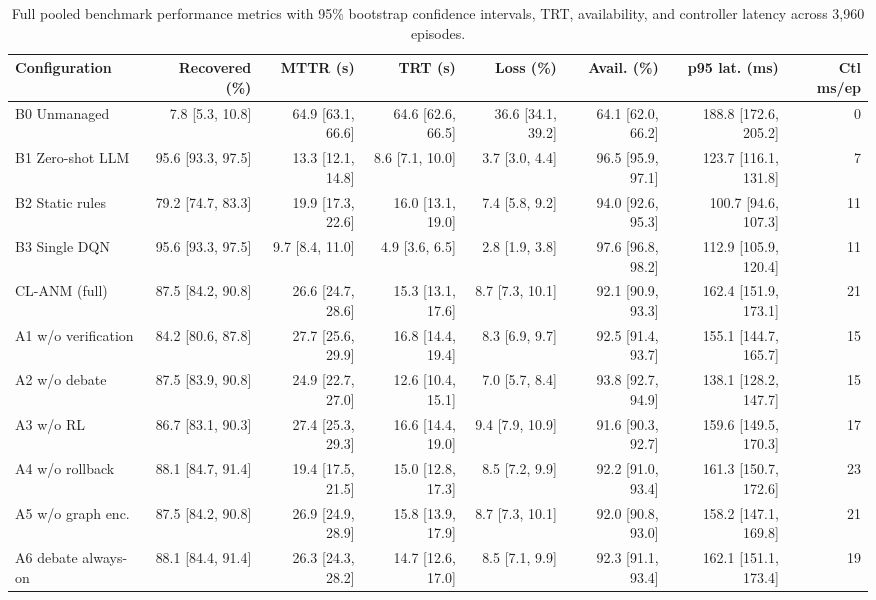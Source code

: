 \documentclass[sn-mathphys,Numbered]{sn-jnl}
\begin{document}
\begin{appendices}
\begin{table}[h]\centering\scriptsize\setlength{\tabcolsep}{3pt}
\caption{Full pooled benchmark performance metrics with 95\% bootstrap confidence intervals, TRT, availability, and controller latency across 3,960 episodes.}\label{tab:main_ci}%
\begin{adjustbox}{max width=\textwidth,center}
\begin{tabular}{lrrrrrrr}
\toprule
Configuration & Recovered (\%) & MTTR (s) & TRT (s) & Loss (\%) & Avail. (\%) & p95 lat. (ms) & Ctl ms/ep \\
\midrule
B0 Unmanaged & 7.8 [5.3, 10.8] & 64.9 [63.1, 66.6] & 64.6 [62.6, 66.5] & 36.6 [34.1, 39.2] & 64.1 [62.0, 66.2] & 188.8 [172.6, 205.2] & 0 \\
B1 Zero-shot LLM & 95.6 [93.3, 97.5] & 13.3 [12.1, 14.8] & 8.6 [7.1, 10.0] & 3.7 [3.0, 4.4] & 96.5 [95.9, 97.1] & 123.7 [116.1, 131.8] & 7 \\
B2 Static rules & 79.2 [74.7, 83.3] & 19.9 [17.3, 22.6] & 16.0 [13.1, 19.0] & 7.4 [5.8, 9.2] & 94.0 [92.6, 95.3] & 100.7 [94.6, 107.3] & 11 \\
B3 Single DQN & 95.6 [93.3, 97.5] & 9.7 [8.4, 11.0] & 4.9 [3.6, 6.5] & 2.8 [1.9, 3.8] & 97.6 [96.8, 98.2] & 112.9 [105.9, 120.4] & 11 \\
CL-ANM (full) & 87.5 [84.2, 90.8] & 26.6 [24.7, 28.6] & 15.3 [13.1, 17.6] & 8.7 [7.3, 10.1] & 92.1 [90.9, 93.3] & 162.4 [151.9, 173.1] & 21 \\
A1 w/o verification & 84.2 [80.6, 87.8] & 27.7 [25.6, 29.9] & 16.8 [14.4, 19.4] & 8.3 [6.9, 9.7] & 92.5 [91.4, 93.7] & 155.1 [144.7, 165.7] & 15 \\
A2 w/o debate & 87.5 [83.9, 90.8] & 24.9 [22.7, 27.0] & 12.6 [10.4, 15.1] & 7.0 [5.7, 8.4] & 93.8 [92.7, 94.9] & 138.1 [128.2, 147.7] & 15 \\
A3 w/o RL & 86.7 [83.1, 90.3] & 27.4 [25.3, 29.3] & 16.6 [14.4, 19.0] & 9.4 [7.9, 10.9] & 91.6 [90.3, 92.7] & 159.6 [149.5, 170.3] & 17 \\
A4 w/o rollback & 88.1 [84.7, 91.4] & 19.4 [17.5, 21.5] & 15.0 [12.8, 17.3] & 8.5 [7.2, 9.9] & 92.2 [91.0, 93.4] & 161.3 [150.7, 172.6] & 23 \\
A5 w/o graph enc. & 87.5 [84.2, 90.8] & 26.9 [24.9, 28.9] & 15.8 [13.9, 17.9] & 8.7 [7.3, 10.1] & 92.0 [90.8, 93.0] & 158.2 [147.1, 169.8] & 21 \\
A6 debate always-on & 88.1 [84.4, 91.4] & 26.3 [24.3, 28.2] & 14.7 [12.6, 17.0] & 8.5 [7.1, 9.9] & 92.3 [91.1, 93.4] & 162.1 [151.1, 173.4] & 19 \\
\bottomrule
\end{tabular}
\end{adjustbox}
\end{table}

\end{appendices}
\end{document}
